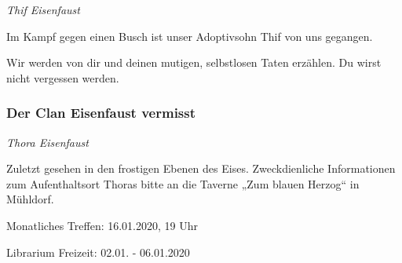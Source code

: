 \begin{center}
  \textit{Thif Eisenfaust}
\end{center}

Im Kampf gegen einen Busch ist unser Adoptivsohn Thif von uns gegangen.

Wir werden von dir und deinen mutigen, selbstlosen Taten erzählen.
Du wirst nicht vergessen werden.

\subsubsection{Der Clan Eisenfaust vermisst}

\begin{center}
  \textit{Thora Eisenfaust}
\end{center}

Zuletzt gesehen in den frostigen Ebenen des Eises.
Zweckdienliche Informationen zum Aufenthaltsort Thoras bitte an die Taverne „Zum blauen Herzog“ in Mühldorf.




\begin{termine}
  \item Monatliches Treffen: 16.01.2020, 19 Uhr
  \item Librarium Freizeit: 02.01. - 06.01.2020
\end{termine}

\impressum


